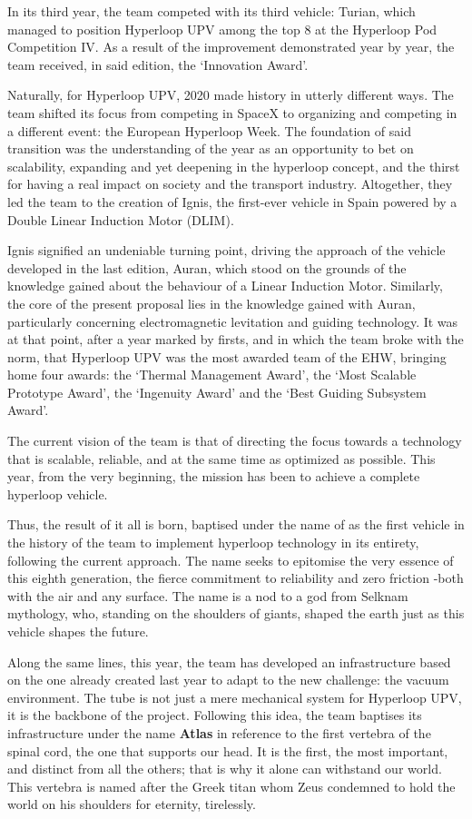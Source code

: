 In its third year, the team competed with its third vehicle: Turian, which managed to position Hyperloop UPV among the top 8 at the Hyperloop Pod Competition IV. As a result of the improvement demonstrated year by year, the team received, in said edition, the ‘Innovation Award’. 

Naturally, for Hyperloop UPV, 2020 made history in utterly different ways. The team shifted its focus from competing in SpaceX to organizing and competing in a different event: the European Hyperloop Week. The foundation of said transition was the understanding of the year as an opportunity to bet on scalability, expanding and yet deepening in the hyperloop concept, and the thirst for having a real impact on society and the transport industry. Altogether, they led the team to the creation of Ignis, the first-ever vehicle in Spain powered by a Double Linear Induction Motor (DLIM).

Ignis signified an undeniable turning point, driving the approach of the vehicle developed in the last edition, Auran, which stood on the grounds of the knowledge gained about the behaviour of a Linear Induction Motor. Similarly, the core of the present proposal lies in the knowledge gained with Auran, particularly concerning electromagnetic levitation and guiding technology. It was at that point, after a year marked by firsts, and in which the team broke with the norm, that Hyperloop UPV was the most awarded team of the EHW, bringing home four awards: the ‘Thermal Management Award’, the ‘Most Scalable Prototype Award’, the ‘Ingenuity Award’ and the ‘Best Guiding Subsystem Award’. 

The current vision of the team is that of directing the focus towards a technology that is scalable, reliable, and at the same time as optimized as possible. This year, from the very beginning, the mission has been to achieve a complete hyperloop vehicle.

Thus, the result of it all is born, baptised under the name of  \Nombre as the first vehicle in the history of the team to implement hyperloop technology in its entirety, following the current approach. The name seeks to epitomise the very essence of this eighth generation, the fierce commitment to reliability and zero friction -both with the air and any surface. The name is a nod to a god from Selknam mythology, who, standing on the shoulders of giants, shaped the earth just as this vehicle shapes the future. 

Along the same lines, this year, the team has developed an infrastructure based on the one already created last year to adapt to the new challenge: the vacuum environment. The tube is not just a mere mechanical system for Hyperloop UPV, it is the backbone of the project. Following this idea, the team baptises its infrastructure under the name \textbf{Atlas} in reference to the first vertebra of the spinal cord, the one that supports our head. It is the first, the most important, and distinct from all the others; that is why it alone can withstand our world. This vertebra is named after the Greek titan whom Zeus condemned to hold the world on his shoulders for eternity, tirelessly.\\ 

